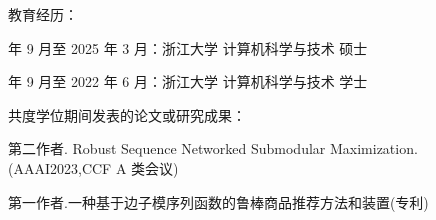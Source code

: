 \cleardoublepage
{}

教育经历：

\indent {} 年 9 月至 2025 年 3 月：浙江大学 计算机科学与技术 硕士

\indent {} 年 9 月至 2022 年 6 月：浙江大学 计算机科学与技术 学士

共度学位期间发表的论文或研究成果：

\indent \indent [1] 第二作者. Robust Sequence Networked Submodular Maximization. (AAAI2023,CCF A 类会议)

\indent \indent [2] 第一作者.一种基于边子模序列函数的鲁棒商品推荐方法和装置(专利)